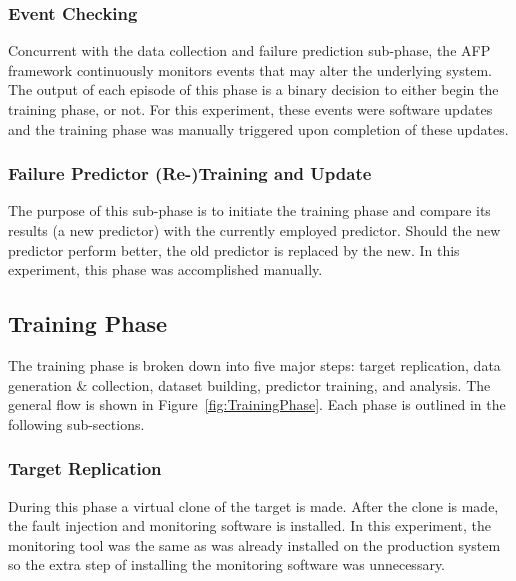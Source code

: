 \subsubsection{Event Checking}
Concurrent with the data collection and failure prediction sub-phase, the
\ac{AFP} framework continuously monitors events that may alter the underlying
system.  The output of each episode of this phase is a binary decision to
either begin the training phase, or not.  For this experiment, these events
were software updates and the training phase was manually triggered upon
completion of these updates.

\subsubsection{Failure Predictor (Re-)Training and Update}
The purpose of this sub-phase is to initiate the training phase and compare its
results (a new predictor) with the currently employed predictor.  Should the
new predictor perform better, the old predictor is replaced by the new.  In
this experiment, this phase was accomplished manually.

\subsection{Training Phase}
The training phase is broken down into five major steps:  target replication,
data generation \& collection, dataset building, predictor training, and
analysis.  The general flow is shown in Figure~\ref{fig:TrainingPhase}.  Each
phase is outlined in the following sub-sections.

\figTrainingPhase{4in}

\subsubsection{Target Replication}
During this phase a virtual clone of the target is made.  After the clone is
made, the fault injection and monitoring software is installed.  In this
experiment, the monitoring tool was the same as was already installed on the
production system so the extra step of installing the monitoring software was
unnecessary.


